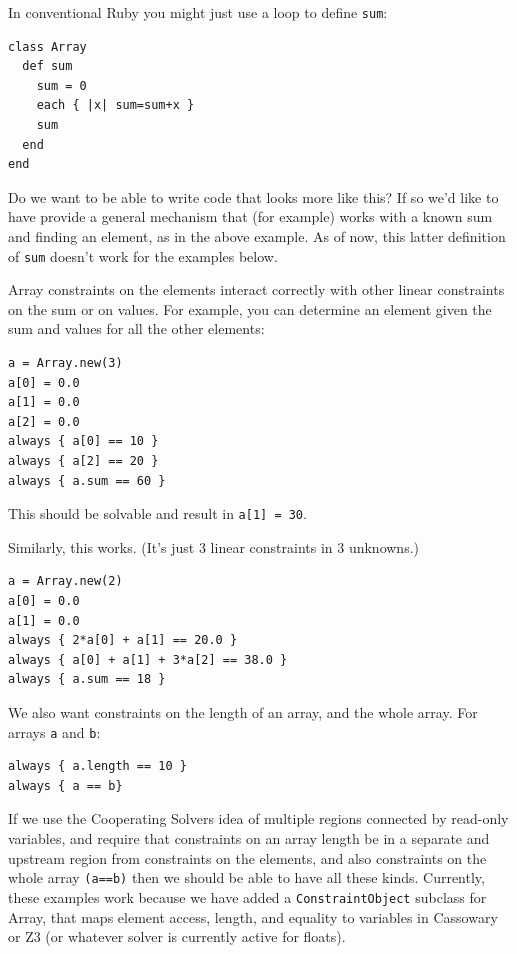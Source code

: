 \documentclass[11pt]{article}
\begin{document}
In conventional Ruby you might just use a loop to define
\lstinline{sum}:
\begin{lstlisting}
class Array
  def sum
    sum = 0
    each { |x| sum=sum+x }
    sum
  end
end
\end{lstlisting}

Do we want to be able to write code that looks more like this?  If so
we'd like to have provide a general mechanism that (for example) works
with a known sum and finding an element, as in the above example. As
of now, this latter definition of \lstinline{sum} doesn't work for the
examples below.

Array constraints on the elements interact correctly with other linear
constraints on the sum or on values. For example, you can determine an
element given the sum and values for all the other elements:

\begin{lstlisting}
a = Array.new(3)
a[0] = 0.0
a[1] = 0.0
a[2] = 0.0
always { a[0] == 10 }
always { a[2] == 20 }
always { a.sum == 60 }
\end{lstlisting}

This should be solvable and result in \lstinline{a[1] = 30}.

Similarly, this works.  (It's just 3 linear constraints in 3
unknowns.)

\begin{lstlisting}
a = Array.new(2)
a[0] = 0.0
a[1] = 0.0
always { 2*a[0] + a[1] == 20.0 }
always { a[0] + a[1] + 3*a[2] == 38.0 }
always { a.sum == 18 }
\end{lstlisting}

We also want constraints on the length of an array, and the whole array.
For arrays \lstinline{a} and \lstinline{b}:

\begin{lstlisting}
always { a.length == 10 }
always { a == b}
\end{lstlisting}

If we use the Cooperating Solvers idea of multiple regions connected
by read-only variables, and require that constraints on an array
length be in a separate and upstream region from constraints on the
elements, and also constraints on the whole array \lstinline{(a==b)}
then we should be able to have all these kinds. Currently, these
examples work because we have added a \texttt{ConstraintObject}
subclass for Array, that maps element access, length, and equality to
variables in Cassowary or Z3 (or whatever solver is currently active
for floats).
\end{document}
